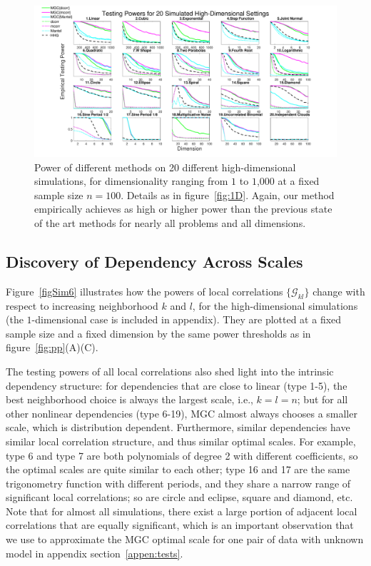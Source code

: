 \documentclass[11pt]{article}
\newcommand{\G}{\mathcal{G}}
\begin{document}
\begin{figure}[htbp]
\includegraphics[width=1.0\textwidth]{Figures/Fig5}
\caption{Power of different methods on 20 different high-dimensional simulations, for dimensionality ranging from $1$ to $1$,$000$ at a fixed sample size $n=100$.  Details as in figure~\ref{fig:1D}.
Again, our method empirically achieves as high or higher power than the previous state of the art methods for nearly all problems and all dimensions.
}
\label{fig:nD}
\end{figure}

\subsection{Discovery of Dependency Across Scales}
\label{main3}

Figure~\ref{figSim6} illustrates how the powers of local correlations $\{\G_{kl}\}$ change with respect to increasing neighborhood $k$ and $l$, for the high-dimensional simulations (the $1$-dimensional case is included in appendix). They are plotted at a fixed sample size and a fixed dimension by the same power thresholds as in figure~\ref{fig:pp}(A)(C). 

The testing powers of all local correlations also shed light into the intrinsic dependency structure: for dependencies that are close to linear (type 1-5), the best neighborhood choice is always the largest scale, i.e., $k=l=n$; but for all other nonlinear dependencies (type 6-19), MGC almost always chooses a smaller scale, which is distribution dependent. Furthermore, similar dependencies have similar local correlation structure, and thus similar optimal scales. For example, type 6 and type 7 are both polynomials of degree 2 with different coefficients, so the optimal scales are quite similar to each other; type 16 and 17 are the same trigonometry function with different periods, and they share a narrow range of significant local correlations; so are circle and eclipse, square and diamond, etc. Note that for almost all simulations, there exist a large portion of adjacent local correlations that are equally significant, which is an important observation that we use to approximate the MGC optimal scale for one pair of data with unknown model in appendix section~\ref{appen:tests}.
\end{document}
